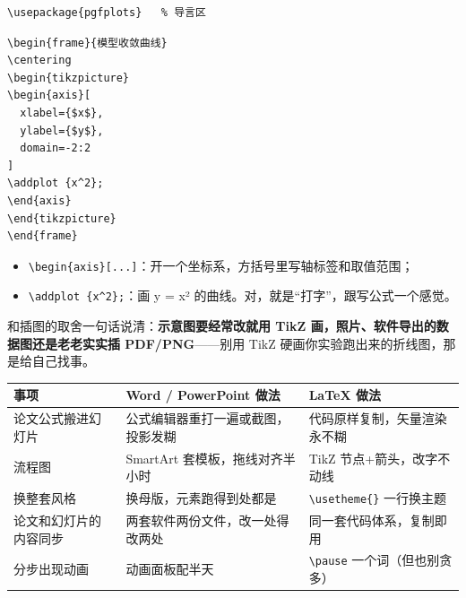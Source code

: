 \begin{lstlisting}
\usepackage{pgfplots}   % 导言区
\end{lstlisting}

\begin{lstlisting}
\begin{frame}{模型收敛曲线}
\centering
\begin{tikzpicture}
\begin{axis}[
  xlabel={$x$},
  ylabel={$y$},
  domain=-2:2
]
\addplot {x^2};
\end{axis}
\end{tikzpicture}
\end{frame}
\end{lstlisting}

\begin{itemize}
\setlength{\itemsep}{2pt}
\item \texttt{\textbackslash{}begin\{axis\}[...]}：开一个坐标系，方括号里写轴标签和取值范围；
\item \texttt{\textbackslash{}addplot \{x\textasciicircum{}2\};}：画 y = x² 的曲线。对，就是“打字”，跟写公式一个感觉。
\end{itemize}

和插图的取舍一句话说清：\textbf{示意图要经常改就用 TikZ 画，照片、软件导出的数据图还是老老实实插 PDF/PNG}——别用 TikZ 硬画你实验跑出来的折线图，那是给自己找事。


\begin{table}[htbp]
\centering
\small
\begin{tabularx}{\linewidth}{@{}*{3}{>{\raggedright\arraybackslash}X}@{}}
\toprule
\textbf{事项} & \textbf{Word / PowerPoint 做法} & \textbf{LaTeX 做法} \\
\midrule
论文公式搬进幻灯片 & 公式编辑器重打一遍或截图，投影发糊 & 代码原样复制，矢量渲染永不糊 \\
流程图 & SmartArt 套模板，拖线对齐半小时 & TikZ 节点+箭头，改字不动线 \\
换整套风格 & 换母版，元素跑得到处都是 & \texttt{\textbackslash{}usetheme\{\}} 一行换主题 \\
论文和幻灯片的内容同步 & 两套软件两份文件，改一处得改两处 & 同一套代码体系，复制即用 \\
分步出现动画 & 动画面板配半天 & \texttt{\textbackslash{}pause} 一个词（但也别贪多） \\
\bottomrule
\end{tabularx}
\end{table}

